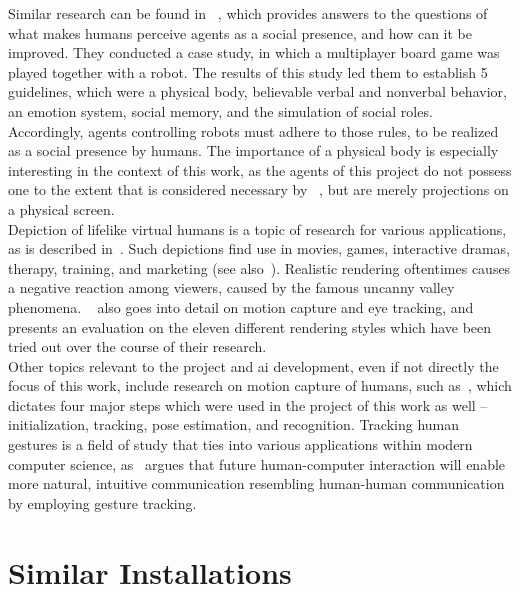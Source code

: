 \documentclass[draft,final]{vutinfth} %
\begin{document}
Similar research can be found in ~\cite{pereira2014improving}, which provides answers to the questions of what makes humans perceive agents as a social presence, and how can it be improved. 
They conducted a case study, in which a multiplayer board game was played together with a robot. 
The results of this study led them to establish 5 guidelines, which were a physical body, believable verbal and nonverbal behavior, an emotion system, social memory, and the simulation of social roles.
Accordingly, agents controlling robots must adhere to those rules, to be realized as a social presence by humans. 
The importance of a physical body is especially interesting in the context of this work, as the agents of this project do not possess one to the extent that is considered necessary by ~\cite{pereira2014improving}, but are merely projections on a physical screen. \\
Depiction of lifelike virtual humans is a topic of research for various applications, as is described in~\cite{mcdonnell2012render}. 
Such depictions find use in movies, games, interactive dramas, therapy, training, and marketing (see also~\cite{gratch2002creating}). 
Realistic rendering oftentimes causes a negative reaction among viewers, caused by the famous uncanny valley phenomena. 
~\cite{mcdonnell2012render} also goes into detail on motion capture and eye tracking, and presents an evaluation on the eleven different rendering styles which have been tried out over the course of their research. \\
Other topics relevant to the project and \gls{ai} development, even if not directly the focus of this work, include research on motion capture of humans, such as~\cite{moeslund2006survey}, which dictates four major steps which were used in the project of this work as well – initialization, tracking, pose estimation, and recognition. 
Tracking human gestures is a field of study that ties into various applications within modern computer science, as~\cite{wachs2011vision} argues that future human-computer interaction will enable more natural, intuitive communication resembling human-human communication by employing gesture tracking.

\section{Similar Installations}
\label{chap:similarinstallations}
\end{document}
